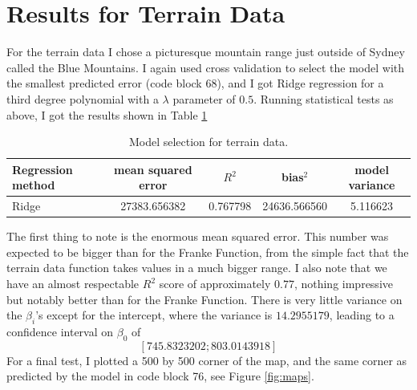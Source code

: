 \documentclass[parskip=half]{scrartcl}
\theoremstyle{definition}
\theoremstyle{remark}
\begin{document}
\section{Results for Terrain Data} \label{sec:terrain}

For the terrain data I chose a picturesque mountain range just outside of Sydney called the Blue Mountains. 
I again used cross validation to select the model with the smallest predicted error (code block 68), and I got Ridge regression for a third degree polynomial with a $\lambda$ parameter of $0.5$.
Running statistical tests as above, I got the results shown in Table \ref{tab:td}

\begin{table} 
\begin{center}
\caption{Model selection for terrain data.}
\label{tab:td}
\begin{tabular}{l|cccc}
Regression method & mean squared error & $R^2$ & bias$^2$ & model variance  \\ 
\hline
\hline 
Ridge & 27383.656382 & 0.767798 & 24636.566560 & 5.116623 \\ 
\end{tabular} 
\end{center}
\end{table}
The first thing to note is the enormous mean squared error. 
This number was expected to be bigger than for the Franke Function, from the simple fact that the terrain data function takes values in a much bigger range. 
I also note that we have an almost respectable $R^2$ score of approximately $0.77$, nothing impressive but notably better than for the Franke Function. 
There is very little variance on the $\beta_i$'s except for the intercept, where the variance is $14.2955179$, leading to a confidence interval on $\beta_0$ of 
\[
	[745.8323202; 803.0143918]
\]
For a final test, I plotted a 500 by 500 corner of the map, and the same corner as predicted by the model in code block 76, see Figure \ref{fig:maps}.
\end{document}
